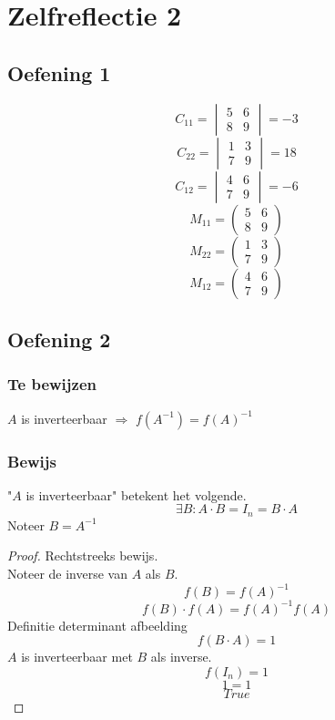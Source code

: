 \documentclass[lineaire_algebra_oplossingen.tex]{subfiles}
\begin{document}
\section{Zelfreflectie 2}
\subsection{Oefening 1}
\[
C_{11} = 
\begin{vmatrix}
5 & 6 \\
8 & 9
\end{vmatrix}
=-3
\]
\[
C_{22}= 
\begin{vmatrix}
1 & 3 \\
7 & 9
\end{vmatrix}
=
18
\]
\[
C_{12} =
\begin{vmatrix}
4 & 6 \\
7 & 9
\end{vmatrix}
=-6
\]
\[
M_{11} = 
\begin{pmatrix}
5 & 6 \\
8 & 9
\end{pmatrix}
\]
\[
M_{22}= 
\begin{pmatrix}
1 & 3 \\
7 & 9
\end{pmatrix}
\]
\[
M_{12} =
\begin{pmatrix}
4 & 6 \\
7 & 9
\end{pmatrix}
\]
\subsection{Oefening 2}
\subsubsection*{Te bewijzen}
$A$ is inverteerbaar $\Rightarrow$ $f(A^{-1}) = f(A)^{-1}$
\subsubsection*{Bewijs}
"$A$ is inverteerbaar" betekent het volgende.
\[
\exists B: A\cdot B = I_n = B\cdot A
\]
Noteer $B = A^{-1}$ 
\begin{proof}
Rechtstreeks bewijs.\\
Noteer de inverse van $A$ als $B$.
\[
f(B) = f(A)^{-1}
\]
\[
f(B)\cdot f(A) = f(A)^{-1}f(A)
\]
Definitie determinant afbeelding
\[
f(B\cdot A) = 1
\]
$A$ is inverteerbaar met $B$ als inverse.
\[
f(I_n) = 1
\]
\[
1 = 1
\]
\[
True
\]
\end{proof}
\end{document}
